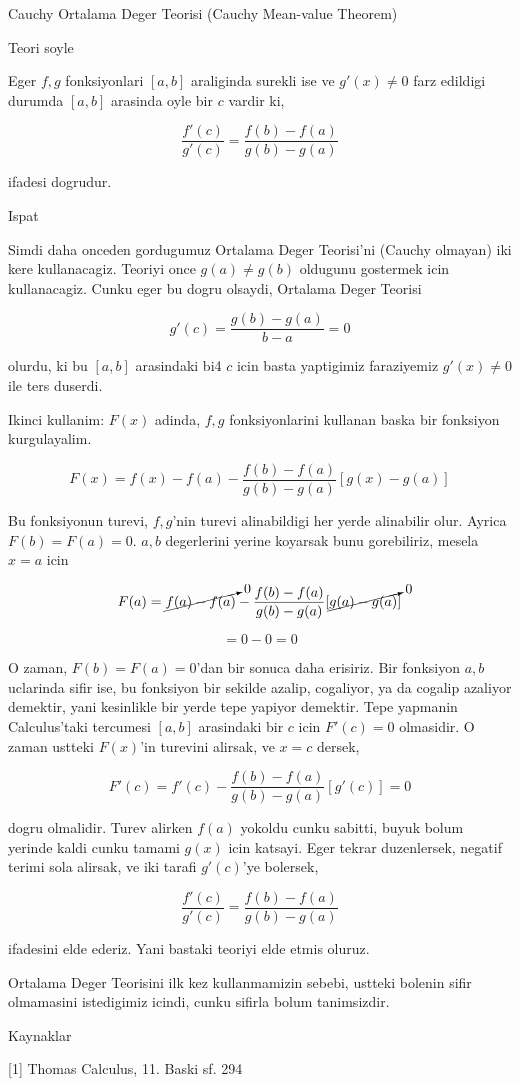 \documentclass[12pt,fleqn]{article}\usepackage{../common}
\begin{document}
Cauchy Ortalama Deger Teorisi (Cauchy Mean-value Theorem)

Teori soyle

Eger $f,g$ fonksiyonlari $[a,b]$ araliginda surekli ise ve $g'(x) \ne 0$
farz edildigi durumda $[a,b]$ arasinda oyle bir $c$ vardir ki,

\[ \frac{f'(c)}{g'(c)} = \frac{f(b)-f(a)}{g(b)-g(a)} \]

ifadesi dogrudur. 

Ispat

Simdi daha onceden gordugumuz Ortalama Deger Teorisi'ni (Cauchy olmayan)
iki kere kullanacagiz. Teoriyi once $g(a) \ne g(b)$ oldugunu gostermek icin
kullanacagiz. Cunku eger bu dogru olsaydi, Ortalama Deger Teorisi 

\[ g'(c) = \frac{g(b) - g(a)}{b-a} = 0\]

olurdu, ki bu $[a,b]$ arasindaki bi4 $c$ icin basta yaptigimiz faraziyemiz
$g'(x) \ne 0$ ile ters duserdi. 

Ikinci kullanim: $F(x)$ adinda, $f,g$ fonksiyonlarini kullanan baska bir
fonksiyon kurgulayalim.

\[ F(x) = f(x) - f(a) - \frac{f(b)-f(a) }{g(b)-g(a)}[g(x)-g(a)] \]

Bu fonksiyonun turevi, $f,g$'nin turevi alinabildigi her yerde alinabilir
olur. Ayrica $F(b) = F(a) = 0$. $a,b$ degerlerini yerine koyarsak bunu
gorebiliriz, mesela $x=a$ icin

\[ F(a) = \cancelto{0}{f(a) - f(a)} -
\frac{f(b)-f(a) }{g(b)-g(a)}
[\cancelto{0}{g(a)-g(a)}] 
\]

\[  = 0 - 0 = 0 \]

O zaman, $F(b) = F(a) = 0$'dan bir sonuca daha erisiriz. Bir fonksiyon
$a,b$ uclarinda sifir ise, bu fonksiyon bir sekilde azalip, cogaliyor, ya
da cogalip azaliyor demektir, yani kesinlikle bir yerde tepe yapiyor
demektir. Tepe yapmanin Calculus'taki tercumesi $[a,b]$ arasindaki bir $c$
icin $F'(c)=0$ olmasidir. O zaman ustteki $F(x)$'in turevini alirsak, ve
$x=c$ dersek, 

\[ F'(c) = f'(c) - \frac{f(b)-f(a)}{g(b)-g(a)}[g'(c)] = 0\]

dogru olmalidir. Turev alirken $f(a)$ yokoldu cunku sabitti, buyuk bolum
yerinde kaldi cunku tamami $g(x)$ icin katsayi. Eger tekrar duzenlersek,
negatif terimi sola alirsak, ve iki tarafi $g'(c)$'ye bolersek,

\[ \frac{f'(c)}{g'(c)} = \frac{f(b)-f(a)}{g(b)-g(a)} \]

ifadesini elde ederiz. Yani bastaki teoriyi elde etmis oluruz. 

Ortalama Deger Teorisini ilk kez kullanmamizin sebebi, ustteki bolenin sifir
olmamasini istedigimiz icindi, cunku sifirla bolum tanimsizdir. 



Kaynaklar 

[1] Thomas Calculus, 11. Baski sf. 294
\end{document}
